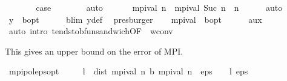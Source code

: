 \begin{isabellebody}
\ \ \ \ \isamarkupfalse%
\ \isamarkupfalse%
\ {\isacharquery}{\kern0pt}case\isanewline
\ \ \ \ \ \ \isamarkupfalse%
\ auto\isanewline
\ \ \isamarkupfalse%
\isanewline
\ \ \isamarkupfalse%
\ {\isachardoublequoteopen}mpi{\isacharunderscore}{\kern0pt}val\ n\ {\isasymle}\ mpi{\isacharunderscore}{\kern0pt}val\ {\isacharparenleft}{\kern0pt}Suc\ n{\isacharparenright}{\kern0pt}{\isachardoublequoteclose}\ \ n\isanewline
\ \ \ \ \isamarkupfalse%
\ auto\isanewline
\ \ \isamarkupfalse%
\ {\isachardoublequoteopen}y\ {\isasymlonglonglongrightarrow}\ {\isasymnu}\isactrlsub b{\isacharunderscore}{\kern0pt}opt{\isachardoublequoteclose}\isanewline
\ \ \ \ \isamarkupfalse%
\ {\isasymL}\isactrlsub b{\isacharunderscore}{\kern0pt}lim\ y{\isacharunderscore}{\kern0pt}def\ \isamarkupfalse%
\ presburger\isanewline
\ \ \isamarkupfalse%
\ {\isachardoublequoteopen}mpi{\isacharunderscore}{\kern0pt}val\ {\isasymlonglonglongrightarrow}\ {\isasymnu}\isactrlsub b{\isacharunderscore}{\kern0pt}opt{\isachardoublequoteclose}\isanewline
\ \ \ \ \isamarkupfalse%
\ aux\isanewline
\ \ \ \ \isamarkupfalse%
\ {\isacharparenleft}{\kern0pt}auto\ intro{\isacharcolon}{\kern0pt}\ tendsto{\isacharunderscore}{\kern0pt}bfun{\isacharunderscore}{\kern0pt}sandwich{\isacharbrackleft}{\kern0pt}OF\ {\isacharunderscore}{\kern0pt}\ w{\isacharunderscore}{\kern0pt}conv{\isacharbrackright}{\kern0pt}{\isacharparenright}{\kern0pt}\isanewline
{}\isamarkupfalse%
%
\endisatagproof
{\isafoldproof}%
%
\isadelimproof
%
\endisadelimproof
%
\isadelimdocument
%
\endisadelimdocument
%
\isatagdocument
%
\isamarkuptrue%
%
\endisatagdocument
{\isafolddocument}%
%
\isadelimdocument
%
\endisadelimdocument
%
\begin{isamarkuptext}%
This gives an upper bound on the error of MPI.%
\end{isamarkuptext}\isamarkuptrue%
\isamarkupfalse%
\ mpi{\isacharunderscore}{\kern0pt}pol{\isacharunderscore}{\kern0pt}eps{\isacharunderscore}{\kern0pt}opt{\isacharcolon}{\kern0pt}\isanewline
\ \ \ {\isachardoublequoteopen}{}\ {\isacharasterisk}{\kern0pt}\ l\ {\isacharasterisk}{\kern0pt}\ dist\ {\isacharparenleft}{\kern0pt}mpi{\isacharunderscore}{\kern0pt}val\ n{\isacharparenright}{\kern0pt}\ {\isacharparenleft}{\kern0pt}{\isasymL}\isactrlsub b\ {\isacharparenleft}{\kern0pt}mpi{\isacharunderscore}{\kern0pt}val\ n{\isacharparenright}{\kern0pt}{\isacharparenright}{\kern0pt}\ {\isacharless}{\kern0pt}\ eps\ {\isacharasterisk}{\kern0pt}\ {\isacharparenleft}{\kern0pt}{}\ {\isacharminus}{\kern0pt}\ l{\isacharparenright}{\kern0pt}{\isachardoublequoteclose}\ {\isachardoublequoteopen}eps\ {\isachargreater}{\kern0pt}\ {}{\isachardoublequoteclose}\isanewline

\end{isabellebody}
